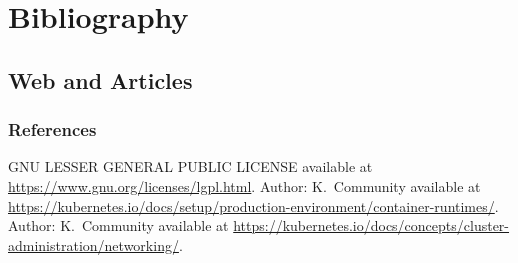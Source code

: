 \section{Bibliography}
\subsection*{Web and Articles}

\begin{frame}[allowframebreaks]
	\frametitle<presentation>{References}
	
		\begin{thebibliography}{10}
				GNU LESSER GENERAL PUBLIC LICENSE
				\newblock available at \url{https://www.gnu.org/licenses/lgpl.html}.
				Author: K.~Community
				\newblock available at \url{https://kubernetes.io/docs/setup/production-environment/container-runtimes/}.
				Author: K.~Community
				\newblock available at \url{https://kubernetes.io/docs/concepts/cluster-administration/networking/}.
	\end{thebibliography}
\end{frame}